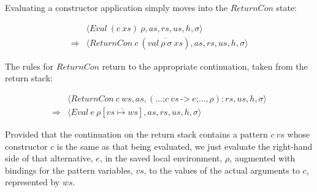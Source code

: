 \documentclass[10pt,a4paper]{exam} %
\begin{document}
Evaluating a constructor application simply moves into the $\mathit{ReturnCon}$ state:
\begin{mdframed}
\begin{equation}
\begin{array}{cl}
 & \langle \mathit{Eval}~(c~\mathit{xs})~\rho, \mathit{as}, \mathit{rs}, \mathit{us}, h, \sigma \rangle \\[0.25cm]
\Longrightarrow & \langle \mathit{ReturnCon}~c~(\overline{\mathit{val}~\rho~\sigma~\mathit{xs}}), \mathit{as}, \mathit{rs}, \mathit{us}, h, \sigma \rangle 
\end{array}
\end{equation}
\end{mdframed}
The rules for $\mathit{ReturnCon}$ return to the appropriate continuation, taken from the return stack:
\begin{mdframed}
\begin{equation}
\begin{array}{cl}
 & \langle \mathit{ReturnCon}~c~\mathit{ws}, \mathit{as},  (\ldots \texttt{;} c~\mathit{vs}~\texttt{->}~e \texttt{;} \ldots, \rho) : \mathit{rs}, \mathit{us}, h, \sigma \rangle \\[0.25cm]
\Longrightarrow & \langle \mathit{Eval}~e~\rho[\overline{\mathit{vs} \mapsto \mathit{ws}}], \mathit{as}, \mathit{rs}, \mathit{us}, h, \sigma \rangle
\end{array}
\label{eq:ctrmatch}
\end{equation}
\end{mdframed}
Provided that the continuation on the return stack contains a pattern $c~\mathit{vs}$ whose constructor $c$ is the same as that being evaluated, we just evaluate the right-hand side of that alternative, $e$, in the saved local environment, $\rho$, augmented with bindings for the pattern variables, $\mathit{vs}$, to the values of the actual arguments to $c$, represented by $\mathit{ws}$.
\end{document}
